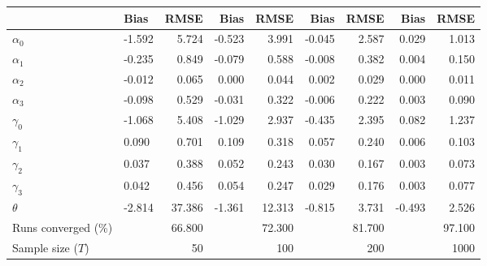 
\begin{tabular}[t]{llrrrrrrr}
\toprule
  & Bias & RMSE & Bias & RMSE & Bias & RMSE & Bias & RMSE\\
\midrule
$\alpha_{0}$ & -1.592 & 5.724 & -0.523 & 3.991 & -0.045 & 2.587 & 0.029 & 1.013\\
$\alpha_{1}$ & -0.235 & 0.849 & -0.079 & 0.588 & -0.008 & 0.382 & 0.004 & 0.150\\
$\alpha_{2}$ & -0.012 & 0.065 & 0.000 & 0.044 & 0.002 & 0.029 & 0.000 & 0.011\\
$\alpha_{3}$ & -0.098 & 0.529 & -0.031 & 0.322 & -0.006 & 0.222 & 0.003 & 0.090\\
$\gamma_{0}$ & -1.068 & 5.408 & -1.029 & 2.937 & -0.435 & 2.395 & 0.082 & 1.237\\
$\gamma_{1}$ & 0.090 & 0.701 & 0.109 & 0.318 & 0.057 & 0.240 & 0.006 & 0.103\\
$\gamma_{2}$ & 0.037 & 0.388 & 0.052 & 0.243 & 0.030 & 0.167 & 0.003 & 0.073\\
$\gamma_{3}$ & 0.042 & 0.456 & 0.054 & 0.247 & 0.029 & 0.176 & 0.003 & 0.077\\
$\theta$ & -2.814 & 37.386 & -1.361 & 12.313 & -0.815 & 3.731 & -0.493 & 2.526\\
Runs converged (\%) &  & 66.800 &  & 72.300 &  & 81.700 &  & 97.100\\
Sample size ($T$) &  & 50 &  & 100 &  & 200 &  & 1000\\
\bottomrule
\end{tabular}
